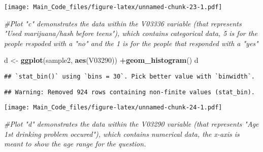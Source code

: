 \documentclass[]{article}
\newenvironment{Shaded}{\begin{snugshade}}{\end{snugshade}}
\newcommand{\KeywordTok}[1]{\textcolor[rgb]{0.13,0.29,0.53}{\textbf{#1}}}
\newcommand{\DecValTok}[1]{\textcolor[rgb]{0.00,0.00,0.81}{#1}}
\newcommand{\StringTok}[1]{\textcolor[rgb]{0.31,0.60,0.02}{#1}}
\newcommand{\CommentTok}[1]{\textcolor[rgb]{0.56,0.35,0.01}{\textit{#1}}}
\newcommand{\OperatorTok}[1]{\textcolor[rgb]{0.81,0.36,0.00}{\textbf{#1}}}
\newcommand{\NormalTok}[1]{#1}
\begin{document}
\texttt{[image: Main\_Code\_files/figure-latex/unnamed-chunk-23-1.pdf]}

\begin{Shaded}
\begin{Highlighting}[]
\CommentTok{#Plot "c" demonstrates the data within the V03336 variable (that represents "Used marijuana/hash before teens"), which contains categorical data, 5 is for the people respoded with a "no" and the 1 is for the people that responded with a "yes"}
\end{Highlighting}
\end{Shaded}

\begin{Shaded}
\begin{Highlighting}[]
\NormalTok{d <-}\StringTok{ }\KeywordTok{ggplot}\NormalTok{(sample2, }\KeywordTok{aes}\NormalTok{(V03290)) }\OperatorTok{+}\KeywordTok{geom_histogram}\NormalTok{()}
\NormalTok{d}
\end{Highlighting}
\end{Shaded}

\begin{verbatim}
## `stat_bin()` using `bins = 30`. Pick better value with `binwidth`.
\end{verbatim}

\begin{verbatim}
## Warning: Removed 924 rows containing non-finite values (stat_bin).
\end{verbatim}

\texttt{[image: Main\_Code\_files/figure-latex/unnamed-chunk-24-1.pdf]}

\begin{Shaded}
\begin{Highlighting}[]
\CommentTok{#Plot "d" demonstrates the data within the V03290 variable (that represents "Age 1st drinking problem occured"), which contains numerical data, the x-axis is meant to show the age range for the question.}
\end{Highlighting}
\end{Shaded}

\begin{Shaded}
\end{Shaded}
\end{document}
